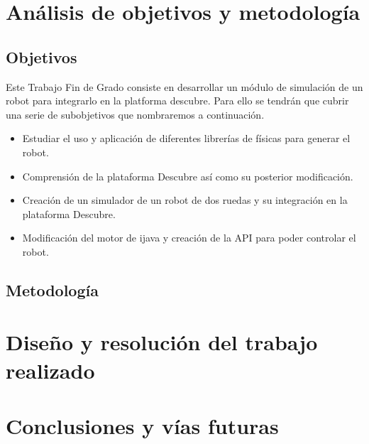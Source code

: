 \chapter{Análisis de objetivos y metodología}\label{objetivos-metodologia}

\section{Objetivos}
\label{sec:Objetivos}

Este Trabajo Fin de Grado consiste en desarrollar un módulo de simulación de un robot para integrarlo en la platforma \Gls{descubre}. Para ello se tendrán que cubrir una serie de subobjetivos que nombraremos a continuación.
\begin{itemize}
\item Estudiar el uso y aplicación de diferentes librerías de físicas para generar el robot.
\item Comprensión de la plataforma Descubre así como su posterior modificación.
\item Creación de un simulador de un robot de dos ruedas y su integración en la plataforma Descubre.
\item Modificación del motor de \gls{ijava} y creación de la \acrshort{API} para poder controlar el robot.
\end{itemize}

\section{Metodología}
\label{sec:metodologia}

\chapter{Diseño y resolución del trabajo realizado}\label{diseno}




\chapter{Conclusiones y vías futuras}\label{conslusiones}
